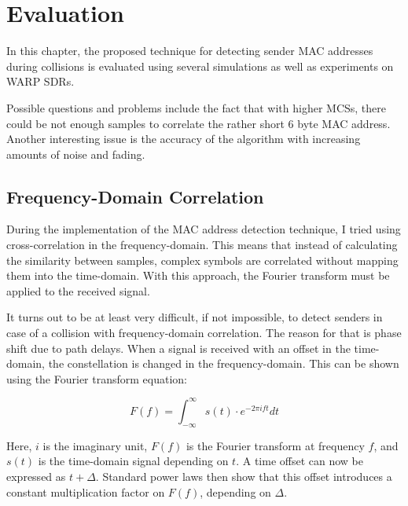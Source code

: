 
\chapter{Evaluation}\label{ch:evaluation}
\glsresetall %

In this chapter, the proposed technique for detecting sender \gls{MAC} addresses during collisions is evaluated using several simulations as well as experiments on \gls{WARP} \glspl{SDR}.

Possible questions and problems include the fact that with higher \glspl{MCS}, there could be not enough samples to correlate the rather short 6 byte \gls{MAC} address. Another interesting issue is the accuracy of the algorithm with increasing amounts of noise and fading.



\section{Frequency-Domain Correlation}\label{sec:freqd-correlation}

During the implementation of the \gls{MAC} address detection technique, I tried using cross-correlation in the frequency-domain. This means that instead of calculating the similarity between samples, complex symbols are correlated without mapping them into the time-domain. With this approach, the Fourier transform must be applied to the received signal.

It turns out to be at least very difficult, if not impossible, to detect senders in case of a collision with frequency-domain correlation. The reason for that is phase shift due to path delays. When a signal is received with an offset in the time-domain, the constellation is changed in the frequency-domain. This can be shown using the Fourier transform equation:

$$ F(f) = \int_{-\infty}^{\infty} s(t) \cdot e^{-2 \pi i f t} dt $$\vspace{0cm}

Here, $ i $ is the imaginary unit, $ F(f) $ is the Fourier transform at frequency $ f $, and $ s(t) $ is the time-domain signal depending on $ t $. A time offset can now be expressed as $ t + \Delta $. Standard power laws then show that this offset introduces a constant multiplication factor on $ F(f) $, depending on $ \Delta $.

